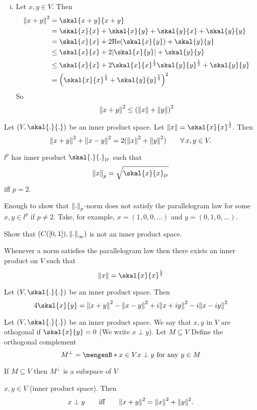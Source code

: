 \begin{beweis}
\begin{enumerate}[(i)]
		\item Let $x,y \in V$. Then 
		\begin{align*}
			\norm{x+y}^2 &= \skal{x+y}{x+y} \\ &= \skal{x}{x}+ \skal{x}{y}+ \skal{y}{x} + \skal{y}{y} \\
			&= \skal{x}{x} + 2 \text{Re}( \skal{x}{y}) + \skal{y}{y} \\
			&\leq  \skal{x}{x}+ 2 \abs{\skal{x}{y}} + \skal{y}{y} \\
			&\leq  \skal{x}{x} + 2 \skal{x}{x}^{\frac{1}{2}}\skal{y}{y}^{\frac{1}{2}} + \skal{y}{y} \\
			&= \left( \skal{x}{x}^{\frac{1}{2}} + \skal{y}{y}^{\frac{1}{2}} \right)^2 
		\end{align*} 
		So
		\[
			\norm{x+y}^2 \leq \left( \norm{x} + \norm{y} \right)^2
		\]
	\end{enumerate}
\end{beweis}
\begin{theorem}
	Let $(V, \skal{.}{.})$ be an inner product space. Let $\norm{x} = \skal{x}{x}^{\frac{1}{2}}$. Then
	\[
		\norm{x+y}^2 + \norm{x-y}^2 = 2 (\norm{x}^2 + \norm{y}^2) \qquad \forall\, x,y \in V.
	\]
\end{theorem}
\begin{satz}
	$l^p$ has inner product $\skal{.}{.}_{l^p}$ such that
	\[
		\norm{x}_p = \sqrt{\skal{x}{x}_{l^p}}
	\]
	iff $p =2$.
\end{satz}
\begin{beweis}
	Enough to show that $\norm{.}_p$-norm does not satisfy the parallelogram law for some $x,y \in l^p$ if $p \neq 2$. Take, for example, $x = (1,0,0, \dots)$
	and $y= (0,1,0, \dots)$.
\end{beweis}
Show that $(C([0,1]),\norm{.}_{\infty})$ is not an inner product space.
\begin{bemerkung}
	Whenever a norm satisfies the parallelogram law then there exists an inner product on $V$ such that
	\[
		\norm{x} = \skal{x}{x}^{\frac{1}{2}}
	\]
\end{bemerkung}
\begin{theorem}
	Let $(V,\skal{.}{.})$ be an inner product space. Then 
	\[
		4 \skal{x}{y}  = \norm{x+y}^2- \norm{x-y}^2 + i \norm{x+ iy}^2 - i \norm{x - iy}^2
	\]
\end{theorem}
\begin{definition}
	Let $(V, \skal{.}{.})$ be an inner product space. We say that $x,y$ in $V$ are othogonal if $\skal{x}{y} = 0$ (We write $x \perp y$). Let $M \subseteq V$
	Define the orthogonal complement
	\[
		M^{\perp} = \set[x \in V]{x \perp y \text{ for any }y \in M}
	\]
\end{definition}
\begin{proposition}
	If $M \subseteq V$ then $M^{\perp}$ is a subspace of $V$
\end{proposition}
\begin{theorem}
	$x,y \in V$ (inner product space). Then
	\[
		x \perp y \qquad \text{iff} \qquad \norm{x+y}^2 = \norm{x}^2 + \norm{y}^2.
	\]
\end{theorem}


